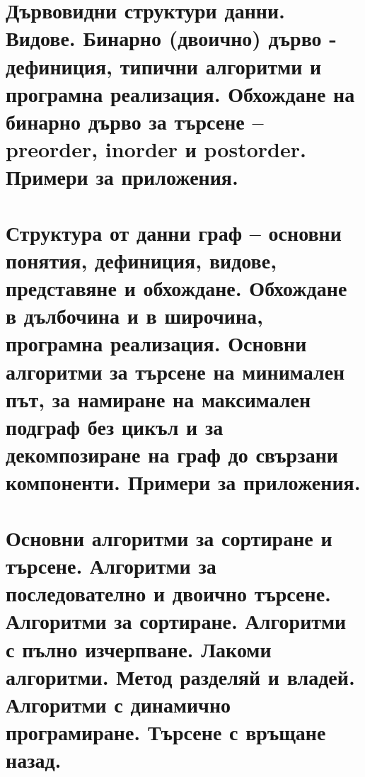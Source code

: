 \chapter{Дървовидни структури данни. Видове. Бинарно (двоично) дърво - дефиниция, типични алгоритми и програмна реализация. Обхождане на бинарно дърво за търсене -- preorder, inorder и postorder. Примери за приложения.}

\chapter{Структура от данни граф – основни понятия, дефиниция, видове, представяне и обхождане. Обхождане в дълбочина и в широчина, програмна реализация. Основни алгоритми за търсене на минимален път, за намиране на максимален подграф без цикъл и за декомпозиране на граф до свързани компоненти. Примери за приложения.}

\chapter{Основни алгоритми за сортиране и търсене. Алгоритми за последователно и двоично търсене. Алгоритми за сортиране. Алгоритми с пълно изчерпване. Лакоми алгоритми. Метод разделяй и владей. Алгоритми с динамично програмиране. Търсене с връщане назад.}

